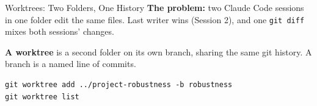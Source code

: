 \documentclass[aspectratio=169, 11pt]{beamer}
\begin{document}
\begin{frame}[fragile]{Worktrees: Two Folders, One History}
  \textbf{The problem:} two Claude Code sessions in one folder edit the same files. Last writer wins (Session 2), and one \texttt{git diff} mixes both sessions' changes.

  \vspace{0.4em}
  \textbf{A worktree} is a second folder on its own branch, sharing the same git history. A branch is a named line of commits.

  \vspace{0.4em}
  \begin{lstlisting}[basicstyle=\ttfamily\footnotesize]
git worktree add ../project-robustness -b robustness
git worktree list
  \end{lstlisting}

  \vspace{0.4em}
  \begin{center}
  \end{center}
\end{frame}
\end{document}
